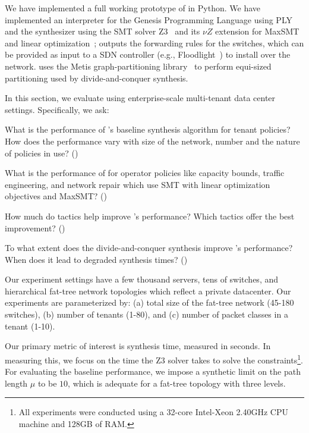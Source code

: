  We have implemented a full working
prototype of \Name in Python. We have implemented an interpreter for
the Genesis Programming Language using PLY~\cite{ply} and the synthesizer using 
the SMT solver Z3~\cite{z3} and its $\nu Z$ extension for MaxSMT and linear
 optimization~\cite{nuz3}; \name outputs the
forwarding rules for the switches, which can be provided as input to a
SDN controller (e.g., Floodlight~\cite{floodlight}) to install over the
network. \Name uses the Metis graph-partitioning library~\cite{metis}
to perform equi-sized partitioning 
used by divide-and-conquer synthesis. 

In this section, we evaluate \Name using
enterprise-scale multi-tenant data
center settings. 
Specifically, we ask:
\begin{compactitemize}

\item What is the performance of \Name's baseline synthesis
  algorithm for tenant policies? How does the performance vary with size of the
  network, number and the nature of policies in use? ()
  
  \item What is the performance of \name for operator policies
  like capacity bounds, traffic engineering, and network repair
  which use SMT with linear optimization objectives and MaxSMT? ()

\item How much do tactics help improve \Name's 
  performance? Which tactics offer the best improvement? ()

\item To what extent does the divide-and-conquer synthesis improve \Name's
  performance? When does it lead to degraded synthesis times? ()



\end{compactitemize}
Our experiment settings have a few thousand servers, tens of switches,
and hierarchical fat-tree network topologies which reflect a private
datacenter. Our experiments are parameterized by: (a) total size of
the fat-tree network (45-180 switches), (b) number of
tenants (1-80), and (c) number of packet classes in a tenant (1-10).

Our primary metric of interest is synthesis time, measured in
seconds. In measuring this, we focus on the time the Z3 solver takes
to solve the constraints\footnote{All experiments were conducted using a
	32-core Intel-Xeon 2.40GHz CPU machine and
	128GB of RAM.}. For evaluating the baseline performance, we impose a
synthetic limit on the path length $\mu$ to be $10$, which is adequate 
for a fat-tree topology with three levels. 

